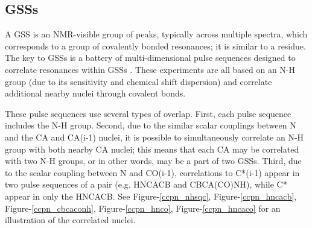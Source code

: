 \subsection{GSSs}
A GSS is an NMR-visible group of peaks, typically across multiple spectra,
which corresponds to a group of covalently bonded resonances; it is similar
to a residue.  
The key to GSSs is a battery of multi-dimensional pulse 
sequences designed to correlate resonances within GSSs 
\cite{cavanagh1995protein, hncacb, hnco, cbcaconh}.  These experiments are all
based on an N-H group (due to its sensitivity and chemical shift dispersion)
and correlate additional nearby nuclei through covalent bonds.

These pulse sequences use several types of overlap.  First, each pulse sequence
includes the N-H group.  Second, due to the similar scalar couplings between
N and the CA and CA(i-1) nuclei, it is possible to simultaneously correlate an
N-H group with both nearby CA nuclei; this means that each CA may be correlated
with two N-H groups, or in other words, may be a part of two GSSs. 
Third, due to the scalar coupling between N and CO(i-1), correlations to 
C*(i-1) appear in two pulse sequences of a pair (e.g. HNCACB and CBCA(CO)NH), 
while C* appear in only the HNCACB.  See Figure-\ref{ccpn_nhsqc}, 
Figure-\ref{ccpn_hncacb}, Figure-\ref{ccpn_cbcaconh}, Figure-\ref{ccpn_hnco}, 
Figure-\ref{ccpn_hncaco} for an illustration of the correlated nuclei.

